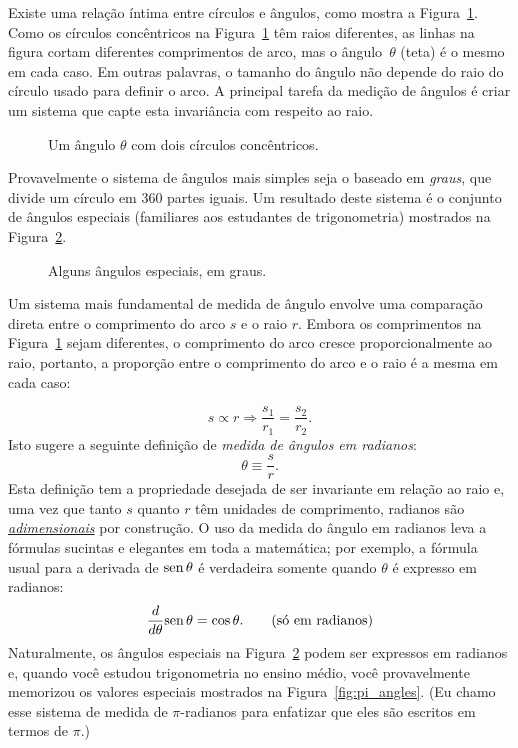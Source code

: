 Existe uma relação íntima entre círculos e ângulos, como mostra a Figura~\ref{fig:angle_arclength}. Como os círculos concêntricos na Figura~\ref{fig:angle_arclength} têm raios diferentes, as linhas na figura cortam diferentes comprimentos de arco, mas o ângulo~$\theta$ (teta) é o mesmo em cada caso. Em outras palavras, o tamanho do ângulo não depende do raio do círculo usado para definir o arco. A principal tarefa da medição de ângulos é criar um sistema que capte esta invariância com respeito ao raio.

\begin{figure}
\begin{center}
\end{center}
\caption{Um ângulo $\theta$ com dois círculos concêntricos.\label{fig:angle_arclength}}
\end{figure}

Provavelmente o sistema de ângulos mais simples seja o baseado em \emph{graus}, que divide um círculo em 360 partes iguais. Um resultado deste sistema é o conjunto de ângulos especiais (familiares aos estudantes de trigonometria) mostrados na Figura~\ref{fig:degree_angles}.

\begin{figure}
\begin{center}
\end{center}
\caption{Alguns ângulos especiais, em graus.\label{fig:degree_angles}}
\end{figure}

Um sistema mais fundamental de medida de ângulo envolve uma comparação direta entre o comprimento do arco $s$ e o raio $r$. Embora os comprimentos na Figura~\ref{fig:angle_arclength} sejam diferentes, o comprimento do arco cresce proporcionalmente ao raio, portanto, a proporção entre o comprimento do arco e o raio é a mesma em cada caso:

\[
s\propto r \Rightarrow \frac{s_1}{r_1} = \frac{s_2}{r_2}.
\]
Isto sugere a seguinte definição de \emph{medida de ângulos em radianos}:
\begin{equation}
\label{eq:radians}
\theta \equiv \frac{s}{r}.
\end{equation}
Esta definição tem a propriedade desejada de ser invariante em relação ao raio e, uma vez que tanto $s$ quanto $r$ têm unidades de comprimento, radianos são \href{https://pt.wikipedia.org/wiki/Magnitude_adimensional}{\emph{adimensionais}} por construção. O uso da medida do ângulo em radianos leva a fórmulas sucintas e elegantes em toda a matemática; por exemplo, a fórmula usual para a derivada de $\mbox{sen}\,\theta$ é verdadeira somente quando $\theta$ é expresso em radianos:
\[
  \frac{d}{d\theta}\mbox{sen}\,\theta = \cos\theta. \qquad\mbox{(só em radianos)}
\]
Naturalmente, os ângulos especiais na Figura~\ref{fig:degree_angles} podem ser expressos em radianos e, quando você estudou trigonometria no ensino médio, você provavelmente memorizou os valores especiais mostrados na Figura~\ref{fig:pi_angles}. (Eu chamo esse sistema de medida de $\pi$-radianos para enfatizar que eles são escritos em termos de $\pi$.)


